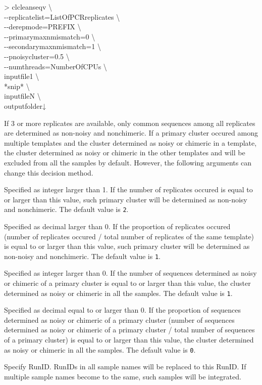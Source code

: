 \documentclass[titlepage,10pt,a4paper,english]{jsbook}
\newenvironment{cmd}{\begin{oframed}\raggedright\ttfamily\footnotesize\setlength{\baselineskip}{1.4em}}{\end{oframed}\vspace{-1em}}
\begin{document}
\begin{cmd}
{\textgreater} clcleanseqv {\textbackslash}\\
{-}{-}replicatelist=ListOfPCRreplicates {\textbackslash}\\
{-}{-}derepmode=PREFIX {\textbackslash}\\
{-}{-}primarymaxnmismatch=0 {\textbackslash}\\
{-}{-}secondarymaxnmismatch=1 {\textbackslash}\\
{-}{-}pnoisycluster=0.5 {\textbackslash}\\
{-}{-}numthreads=NumberOfCPUs {\textbackslash}\\
inputfile1 {\textbackslash}\\
*snip* {\textbackslash}\\
inputfileN {\textbackslash}\\
outputfolder↓
\end{cmd}

If 3 or more replicates are available, only common sequences among all replicates are determined as non-noisy and nonchimeric.
If a primary cluster occured among multiple templates and the cluster determined as noisy or chimeric in a template, the cluster determined as noisy or chimeric in the other templates and will be excluded from all the samples by default.
However, the following arguments can change this decision method.

\begin{description}\small\setlength{\baselineskip}{1.1em}
\item[\texttt{{-}{-}minnreplicate}] Specified as integer larger than 1.
If the number of replicates occured is equal to or larger than this value, such primary cluster will be determined as non-noisy and nonchimeric.
The default value is \texttt{2}.
\item[\texttt{{-}{-}minpreplicate}] Specified as decimal larger than 0.
If the proportion of replicates occured (number of replicates occured / total number of replicates of the same template) is equal to or larger than this value, such primary cluster will be determined as non-noisy and nonchimeric.
The default value is \texttt{1}.
\item[\texttt{{-}{-}minnpositive}] Specified as integer larger than 0.
If the number of sequences determined as noisy or chimeric of a primary cluster is equal to or larger than this value, the cluster determined as noisy or chimeric in all the samples.
The default value is \texttt{1}.
\item[\texttt{{-}{-}minppositive}] Specified as decimal equal to or larger than 0.
If the proportion of sequences determined as noisy or chimeric of a primary cluster (number of sequences determined as noisy or chimeric of a primary cluster / total number of sequences of a primary cluster) is equal to or larger than this value, the cluster determined as noisy or chimeric in all the samples.
The default value is \texttt{0}.
\item[\texttt{{-}{-}runname}] Specify RunID.
RunIDs in all sample names will be replaced to this RunID.
If multiple sample names become to the same, such samples will be integrated.
\end{description}
\end{document}
